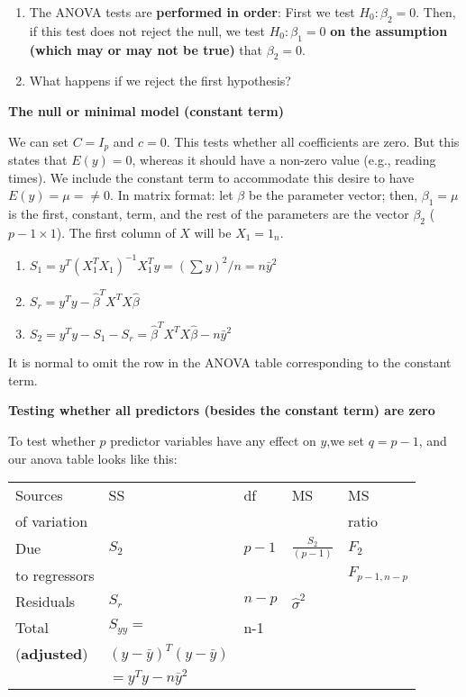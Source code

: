 \documentclass[10pt,landscape]{article}
\begin{document}
\begin{multicols}{3}
\begin{enumerate}
\item 
The ANOVA tests are \textbf{performed in order}:  First we test $H_0: \beta_2=0$. Then, if this test does not reject the null, we test $H_0: \beta_1 = 0$ \textbf{on the assumption (which may or may not be true)} that $\beta_2=0$. 
\item What happens if we reject the first hypothesis?
\end{enumerate}

\textbf{The null or minimal model (constant term)}

We can set $C=I_p$ and $c=0$. This tests whether all coefficients are zero. But this states that $E(y)=0$, whereas it should have a non-zero value (e.g., reading times).  We include the constant term to accommodate this desire to have $E(y)=\mu=\neq 0$. In matrix format: let $\beta$ be the parameter vector; then, $\beta_1=\mu$ is the first, constant, term, and the rest of the parameters are the vector $\beta_2$ ($p-1\times 1$).
The first column of $X$ will be $X_1=1_n$.

\begin{enumerate}
\item
$S_1=y^T (X_1^T X_1)^{-1} X_1^T y = (\sum y)^2/n = n\bar{y}^2$
\item
$S_r = y^Ty - \hat{\beta}^T X^T X\hat{\beta}$
\item
$S_2 = y^T y -S_1 - S_r = \hat{\beta}^T X^T X\hat{\beta}-n\bar{y}^2$
\end{enumerate}

It is normal to omit the row in the ANOVA table corresponding to the constant term.

\medskip
\textbf{Testing whether all predictors (besides the constant term) are zero}

To test whether $p$ predictor variables have any effect on $y$,we set $q=p-1$, and our anova table looks like this:

\begin{tabular}{|l|l|l|l|l|}
\hline
Sources & SS & df & MS & MS \\
of variation  & & & & ratio \\
\hline
Due & $S_2$ & $p-1$ & $\frac{S_2}{(p-1)}$ & $F_2$\\
 to regressors & & & &  $F_{p-1,n-p}$\\
\hline
Residuals   & $S_r$ & $n-p$ & $\hat{\sigma}^2$ & \\
\hline
Total        & $S_{yy}=$  & n-1 &  &\\
 (\textbf{adjusted})    & $(y-\bar{y})^T(y-\bar{y})$ & & & \\
& $=y^T y - n\bar{y}^2$ & & & \\
\hline
\end{tabular}


\end{multicols}
\end{document}
